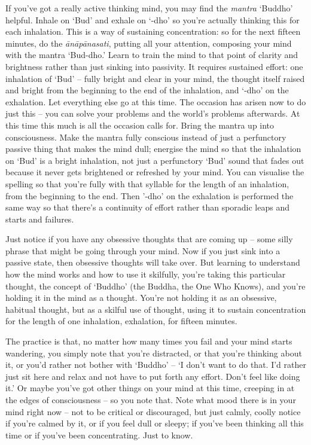 
If you've got a really active thinking mind, you may find the \textit{mantra} `Buddho' helpful. Inhale on `Bud' and exhale on `-dho' so you're actually thinking this for each inhalation. This is a way of sustaining concentration: so for the next fifteen minutes, do the \textit{ānāpānasati}, putting all your attention, composing your mind with the mantra `Bud-dho.' Learn to train the mind to that point of clarity and brightness rather than just sinking into passivity. It requires sustained effort: one inhalation of `Bud' -- fully bright and clear in your mind, the thought itself raised and bright from the beginning to the end of the inhalation, and `-dho' on the exhalation. Let everything else go at this time. The occasion has arisen now to do just this -- you can solve your problems and the world's problems afterwards. At this time this much is all the occasion calls for. Bring the mantra up into consciousness. Make the mantra fully conscious instead of just a perfunctory passive thing that makes the mind dull; energise the mind so that the inhalation on `Bud' is a bright inhalation, not just a perfunctory `Bud' sound that fades out because it never gets brightened or refreshed by your mind. You can visualise the spelling so that you're fully with that syllable for the length of an inhalation, from the beginning to the end. Then '-dho' on the exhalation is performed the same way so that there's a continuity of effort rather than sporadic leaps and starts and failures.

Just notice if you have any obsessive thoughts that are coming up -- some silly phrase that might be going through your mind. Now if you just sink into a passive state, then obsessive thoughts will take over. But learning to understand how the mind works and how to use it skilfully, you're taking this particular thought, the concept of `Buddho' (the Buddha, the One Who Knows), and you're holding it in the mind as a thought. You're not holding it as an obsessive, habitual thought, but as a skilful use of thought, using it to sustain concentration for the length of one inhalation, exhalation, for fifteen minutes.

The practice is that, no matter how many times you fail and your mind starts wandering, you simply note that you're distracted, or that you're thinking about it, or you'd rather not bother with `Buddho' -- `I don't want to do that. I'd rather just sit here and relax and not have to put forth any effort. Don't feel like doing it.' Or maybe you've got other things on your mind at this time, creeping in at the edges of consciousness -- so you note that. Note what mood there is in your mind right now -- not to be critical or discouraged, but just calmly, coolly notice if you're calmed by it, or if you feel dull or sleepy; if you've been thinking all this time or if you've been concentrating. Just to know.

